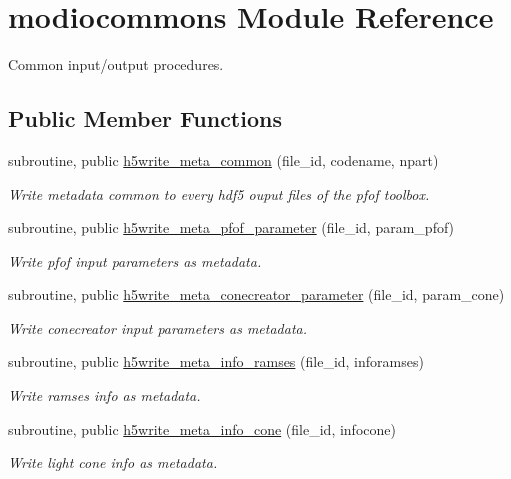 \hypertarget{classmodiocommons}{\section{modiocommons Module Reference}
\label{classmodiocommons}
}


Common input/output procedures.  


\subsection*{Public Member Functions}
\begin{DoxyCompactItemize}
\item 
subroutine, public \hyperlink{classmodiocommons_aafba4b5ca834c55dd741c4040e971e5b}{h5write\-\_\-meta\-\_\-common} (file\-\_\-id, codename, npart)
\begin{DoxyCompactList}\small\item\em Write metadata common to every hdf5 ouput files of the pfof toolbox. \end{DoxyCompactList}\item 
subroutine, public \hyperlink{classmodiocommons_a6c7b87aedd57a36d2f5b643cb3fc7c12}{h5write\-\_\-meta\-\_\-pfof\-\_\-parameter} (file\-\_\-id, param\-\_\-pfof)
\begin{DoxyCompactList}\small\item\em Write pfof input parameters as metadata. \end{DoxyCompactList}\item 
subroutine, public \hyperlink{classmodiocommons_ac97d3aa8a31a87167c05ecbe841397cc}{h5write\-\_\-meta\-\_\-conecreator\-\_\-parameter} (file\-\_\-id, param\-\_\-cone)
\begin{DoxyCompactList}\small\item\em Write conecreator input parameters as metadata. \end{DoxyCompactList}\item 
subroutine, public \hyperlink{classmodiocommons_a88b4f4949433f00d81d86b9b1e031646}{h5write\-\_\-meta\-\_\-info\-\_\-ramses} (file\-\_\-id, inforamses)
\begin{DoxyCompactList}\small\item\em Write ramses info as metadata. \end{DoxyCompactList}\item 
subroutine, public \hyperlink{classmodiocommons_a7357bab67b152d137d4b2d43f30263e5}{h5write\-\_\-meta\-\_\-info\-\_\-cone} (file\-\_\-id, infocone)
\begin{DoxyCompactList}\small\item\em Write light cone info as metadata. \end{DoxyCompactList}\item 

\end{DoxyCompactItemize}
